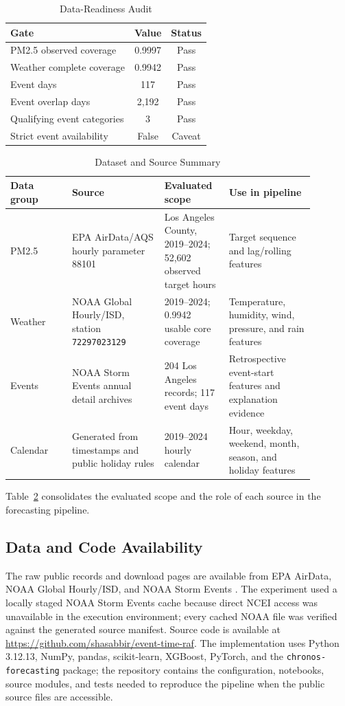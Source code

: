 \begin{table}[!t]
\centering
\caption{Data-Readiness Audit}
\label{tab:data_audit}
\begin{tabular}{lcc}
\toprule
Gate & Value & Status \\
\midrule
PM2.5 observed coverage & 0.9997 & Pass \\
Weather complete coverage & 0.9942 & Pass \\
Event days & 117 & Pass \\
Event overlap days & 2,192 & Pass \\
Qualifying event categories & 3 & Pass \\
Strict event availability & False & Caveat \\
\bottomrule
\end{tabular}
\end{table}

\begin{table}[!t]
\centering
\caption{Dataset and Source Summary}
\label{tab:dataset_summary}
\begin{tabular}{p{0.18\linewidth}p{0.27\linewidth}p{0.18\linewidth}p{0.25\linewidth}}
\toprule
Data group & Source & Evaluated scope & Use in pipeline \\
\midrule
PM2.5 & EPA AirData/AQS hourly parameter 88101 & Los Angeles County,
2019--2024; 52,602 observed target hours & Target sequence and lag/rolling
features \\
Weather & NOAA Global Hourly/ISD, station \texttt{72297023129} & 2019--2024;
0.9942 usable core coverage & Temperature, humidity, wind, pressure, and rain
features \\
Events & NOAA Storm Events annual detail archives & 204 Los Angeles records;
117 event days & Retrospective event-start features and explanation evidence \\
Calendar & Generated from timestamps and public holiday rules & 2019--2024
hourly calendar & Hour, weekday, weekend, month, season, and holiday features \\
\bottomrule
\end{tabular}
\end{table}

Table~\ref{tab:dataset_summary} consolidates the evaluated scope and the role
of each source in the forecasting pipeline.

\subsection{Data and Code Availability}
The raw public records and download pages are available from EPA AirData, NOAA
Global Hourly/ISD, and NOAA Storm Events
\cite{epaairdata2026,noaaisd2026,noaastormevents2026}.
The experiment used a locally staged NOAA Storm Events cache because direct
NCEI access was unavailable in the execution environment; every
cached NOAA file was verified against the generated source manifest. Source code
is available at \url{https://github.com/shasabbir/event-time-raf}. The
implementation uses Python 3.12.13, NumPy, pandas, scikit-learn, XGBoost,
PyTorch, and the \texttt{chronos-forecasting} package; the repository contains
the configuration, notebooks, source modules, and tests needed to reproduce the
pipeline when the public source files are accessible.

